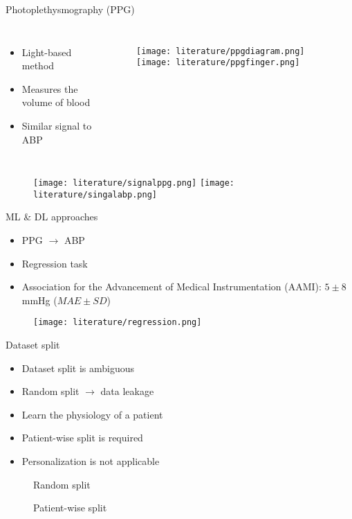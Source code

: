 \begin{frame}{Photoplethysmography (PPG)}
    \begin{columns}
        \begin{itemize}
            \item Light-based method
            \item Measures the volume of blood
            \item Similar signal to ABP
        \end{itemize}

        \begin{figure}
            \texttt{[image: literature/ppgdiagram.png]}
            \texttt{[image: literature/ppgfinger.png]}
        \end{figure}
    \end{columns}
    \begin{figure}
        \texttt{[image: literature/signalppg.png]}
        \texttt{[image: literature/singalabp.png]}
    \end{figure}

\end{frame}

\begin{frame}{ML \& DL approaches}
    \begin{itemize}
        \item PPG $\to$ ABP
        \item Regression task
        \item Association for the Advancement of Medical Instrumentation (AAMI): $5\pm8$ mmHg ($MAE \pm SD$)
    \end{itemize}
    \begin{figure}
        \texttt{[image: literature/regression.png]}
    \end{figure}
\end{frame}

\begin{frame}{Dataset split}
    \begin{itemize}
        \item Dataset split is ambiguous
        \item Random split $\to$ data leakage
        \item Learn the physiology of a patient
        \item Patient-wise split is required
        \item Personalization is not applicable
    \end{itemize}
    \begin{figure}
        \centering
        Random split \medskip \par
        

        \medskip

        Patient-wise split \medskip \par
        
    \end{figure}
\end{frame}

